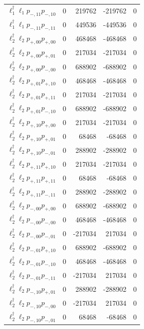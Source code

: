 \begin{longtable}{@{}lrrrr@{}}
$\ell_{1}^\dagger \ell_{1} p_{-,11} p_{-,10}$ & 0 & 219762 & -219762 & 0 \\
$\ell_{1}^\dagger \ell_{1} p_{-,11} p_{-,11}$ & 0 & 449536 & -449536 & 0 \\
$\ell_{2}^\dagger \ell_{2} p_{+,00} p_{+,00}$ & 0 & 468468 & -468468 & 0 \\
$\ell_{2}^\dagger \ell_{2} p_{+,00} p_{+,01}$ & 0 & 217034 & -217034 & 0 \\
$\ell_{2}^\dagger \ell_{2} p_{+,00} p_{-,00}$ & 0 & 688902 & -688902 & 0 \\
$\ell_{2}^\dagger \ell_{2} p_{+,01} p_{+,10}$ & 0 & 468468 & -468468 & 0 \\
$\ell_{2}^\dagger \ell_{2} p_{+,01} p_{+,11}$ & 0 & 217034 & -217034 & 0 \\
$\ell_{2}^\dagger \ell_{2} p_{+,01} p_{-,10}$ & 0 & 688902 & -688902 & 0 \\
$\ell_{2}^\dagger \ell_{2} p_{+,10} p_{+,00}$ & 0 & 217034 & -217034 & 0 \\
$\ell_{2}^\dagger \ell_{2} p_{+,10} p_{+,01}$ & 0 & 68468 & -68468 & 0 \\
$\ell_{2}^\dagger \ell_{2} p_{+,10} p_{-,01}$ & 0 & 288902 & -288902 & 0 \\
$\ell_{2}^\dagger \ell_{2} p_{+,11} p_{+,10}$ & 0 & 217034 & -217034 & 0 \\
$\ell_{2}^\dagger \ell_{2} p_{+,11} p_{+,11}$ & 0 & 68468 & -68468 & 0 \\
$\ell_{2}^\dagger \ell_{2} p_{+,11} p_{-,11}$ & 0 & 288902 & -288902 & 0 \\
$\ell_{2}^\dagger \ell_{2} p_{-,00} p_{+,00}$ & 0 & 688902 & -688902 & 0 \\
$\ell_{2}^\dagger \ell_{2} p_{-,00} p_{-,00}$ & 0 & 468468 & -468468 & 0 \\
$\ell_{2}^\dagger \ell_{2} p_{-,00} p_{-,01}$ & 0 & -217034 & 217034 & 0 \\
$\ell_{2}^\dagger \ell_{2} p_{-,01} p_{+,10}$ & 0 & 688902 & -688902 & 0 \\
$\ell_{2}^\dagger \ell_{2} p_{-,01} p_{-,10}$ & 0 & 468468 & -468468 & 0 \\
$\ell_{2}^\dagger \ell_{2} p_{-,01} p_{-,11}$ & 0 & -217034 & 217034 & 0 \\
$\ell_{2}^\dagger \ell_{2} p_{-,10} p_{+,01}$ & 0 & 288902 & -288902 & 0 \\
$\ell_{2}^\dagger \ell_{2} p_{-,10} p_{-,00}$ & 0 & -217034 & 217034 & 0 \\
$\ell_{2}^\dagger \ell_{2} p_{-,10} p_{-,01}$ & 0 & 68468 & -68468 & 0 \\

\end{longtable}
